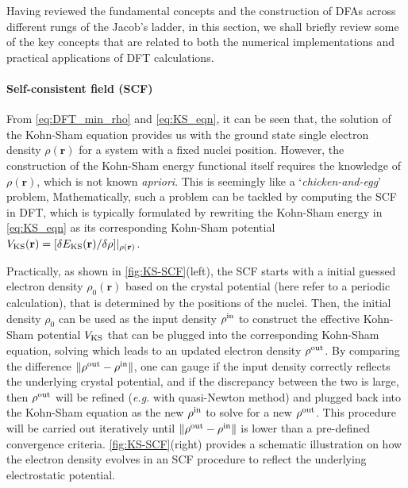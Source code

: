 
Having reviewed the fundamental concepts and the construction of DFAs across different rungs of the Jacob's ladder, in this section, we shall briefly review some of the key concepts that are related to both the numerical implementations and practical applications of DFT calculations.

\paragraph{\textbf{Self-consistent field (SCF)}} From \cref{eq:DFT_min_rho} and \cref{eq:KS_eqn}, it can be seen that, the solution of the Kohn-Sham equation provides us with the ground state single electron density $\rho(\bm{r})$ for a system with a fixed nuclei position. However, the construction of the Kohn-Sham energy functional itself requires the knowledge of $\rho(\bm{r})$, which is not known \emph{apriori}. This is seemingly like a `\emph{chicken-and-egg}' problem, Mathematically, such a problem can be tackled by computing the SCF in DFT, which is typically formulated by rewriting the Kohn-Sham energy in \cref{eq:KS_eqn} as its corresponding Kohn-Sham potential $V_{\scriptsize{\mbox{KS}}}(\mathbf{r})=[\delta E_{\scriptsize{\mbox{KS}}}(\mathbf{r})/\delta \rho]\vert_{\rho(\mathbf{r})}$. 

Practically, as shown in \cref{fig:KS-SCF}(left), the SCF starts with a initial guessed electron density $\rho_{0}(\bm{r})$ based on the crystal potential (here refer to a periodic calculation), that is determined by the positions of the nuclei. Then, the initial density $\rho_{0}$ can be used  as the input density $\rho^{\scriptsize{\mbox{in}}}$ to construct the effective Kohn-Sham potential $V_{\scriptsize{\mbox{KS}}}$ that can be plugged into the corresponding Kohn-Sham equation, solving which leads to an updated electron density $\rho^{\scriptsize{\mbox{out}}}$. By comparing the difference $\| \rho^{\scriptsize{\mbox{out}}}-\rho^{\scriptsize{\mbox{in}}}\|$, one can gauge if the input density correctly reflects the underlying crystal potential, and if the discrepancy between the two is large, then   $\rho^{\scriptsize{\mbox{out}}}$ will be refined (\emph{e.g.} with quasi-Newton method) and plugged back into the Kohn-Sham equation as the new $\rho^{\scriptsize{\mbox{in}}}$ to solve for a new $\rho^{\scriptsize{\mbox{out}}}$. This procedure will be carried out iteratively until $\| \rho^{\scriptsize{\mbox{out}}}-\rho^{\scriptsize{\mbox{in}}}\|$ is lower than a pre-defined convergence criteria. \cref{fig:KS-SCF}(right)\cite{woods2019computing} provides a schematic illustration on how the electron density evolves in an SCF procedure to reflect the underlying electrostatic potential. 
 
